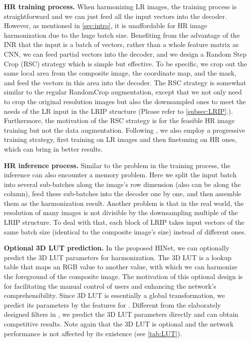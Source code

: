 \documentclass[10pt,journal,twocolumn,twoside]{IEEEtran}
\begin{document}
\textbf{HR training process.} When harmonizing LR images, the training process is straightforward and we can just feed all the input vectors into the decoder. However, as mentioned in \cref{sec:intro}, it is unaffordable for HR image harmonization due to the huge batch size. Benefiting from the advantage of the INR that the input is a batch of vectors, rather than a whole feature matrix as CNN, we can feed partial vectors into the decoder, and we design a Random Step Crop (RSC) strategy which is simple but effective. To be specific, we crop out the same local area from the composite image, the coordinate map, and the mask, and feed the vectors in this area into the decoder. The RSC strategy is somewhat similar to the regular RandomCrop augmentation, except that we not only need to crop the original resolution images but also the downsampled ones to meet the needs of the LR input in the LRIP structure (Please refer to \cref{subsec:LRIP}.). Furthermore, the motivation of the RSC strategy is for the feasible HR image training but not the data augmentation. Following \cite{xue2022dccf}, we also employ a progressive training strategy, first training on LR images and then finetuning on HR ones, which can bring in better results.

\textbf{HR inference process.} Similar to the problem in the training process, the inference can also encounter a memory problem. Here we split the input batch into several sub-batches along the image's row dimension (also can be along the column), feed these sub-batches into the decoder one by one, and then assemble them as the harmonization result. Another problem is that in the real world, the resolution of many images is not divisible by the downsampling multiple of the LRIP structure. To deal with that, each block of LRIP takes input vectors of the same batch size (identical to the composite image's size) instead of different ones.

\textbf{Optional 3D LUT prediction.} In the proposed HINet, we can optionally predict the 3D LUT parameters for harmonization. The 3D LUT is a lookup table that maps an RGB value to another value, with which we can harmonize the foreground of the composite image. The motivation of this optional design is for facilitating the manual control of users and enhancing the network's comprehensibility. Since 3D LUT is essentially a global transformation, we predict its parameters by the features for . Different from the elaborately designed filters in \cite{xue2022dccf, ke2022harmonizer}, we predict the 3D LUT parameters directly and can obtain competitive results. Note again that the 3D LUT is optional and the network performance is not affected by its existence (see \cref{tab:LUT}).
\end{document}
